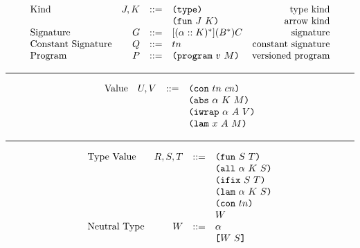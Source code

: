 \documentclass[../plutus-core-specification.tex]{subfiles}
\begin{document}
\begin{minipage}{\linewidth}
\[\begin{array}{lrclr}
        \textrm{Kind}             & J,K    & ::= & \texttt{(} \texttt{type} \texttt{)}{}                   & \textrm{type kind}\\
                                  &        &     & \texttt{(} \texttt{fun} ~ J ~ K \texttt{)}                & \textrm{arrow kind}\\
        \textrm{Signature}        & G      & ::= & [(\alpha :: K)^*](B^*)C     & \textrm{signature}\\
        \textrm{Constant Signature}   & Q      & ::= & tn                     & \textrm{constant signature}\\
        \textrm{Program}          & P      & ::= & \texttt{(} \texttt{program} ~ v ~ M \texttt{)}             & \textrm{versioned program}
    \end{array}\]
    \label{fig:grammar}
\end{minipage}

\medskip
\hrule
\medskip

\begin{minipage}{\linewidth}
    \centering
    \[\begin{array}{lrcl}
        \textrm{Value}            & U, V   & ::= & \texttt{(} \texttt{con} ~ tn ~ cn \texttt{)}         \\
                                  &        &     & \texttt{(} \texttt{abs} ~ \alpha ~ K ~ M \texttt{)}   \\
                                  &        &     & \texttt{(} \texttt{iwrap} ~ \alpha ~ A ~ V \texttt{)} \\
                                  &        &     & \texttt{(} \texttt{lam} ~ x ~ A ~ M \texttt{)}
    \end{array}\]
    \label{fig:values}
\end{minipage}

\medskip
\hrule
\medskip

\begin{minipage}{\linewidth}
    \centering
    \[\begin{array}{lrcl}
        \textrm{Type Value}       & R,S,T  & ::= & \texttt{(} \texttt{fun} ~ S ~ T \texttt{)}          \\
                                  &        &     & \texttt{(} \texttt{all} ~ \alpha ~ K ~ S \texttt{)}  \\
                                  &        &     & \texttt{(} \texttt{ifix} ~ S ~ T \texttt{)}          \\
                                  &        &     & \texttt{(} \texttt{lam} ~ \alpha ~ K ~ S \texttt{)}  \\
                                  &        &     & \texttt{(} \texttt{con} ~ tn \texttt{)}           \\
                                  &        &     & W                    \\
        \textrm{Neutral Type}     & W      & ::= & \alpha               \\
                                  &        &     & \texttt{[} W ~ S \texttt{]}          \\
    \end{array}\]
    \label{fig:type-values}
\end{minipage}
\end{document}
